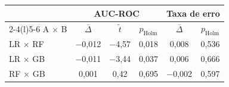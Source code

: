\begin{tabular}{@{}lccccc@{}}
\toprule
 & \multicolumn{3}{c}{AUC-ROC} & \multicolumn{2}{c}{Taxa de erro} \\
\cmidrule(lr){2-4}\cmidrule(l){5-6}
A $\times$ B & $\overline{\Delta}$ & $\tilde{t}$ & $p_{\mathrm{Holm}}$ & $\overline{\Delta}$ & $p_{\mathrm{Holm}}$ \\
\midrule
LR $\times$ RF & $-$0{,}012 & $-$4{,}57 & 0{,}018 & 0{,}008 & 0{,}536 \\
LR $\times$ GB & $-$0{,}011 & $-$3{,}44 & 0{,}037 & 0{,}006 & 0{,}666 \\
RF $\times$ GB & 0{,}001 & 0{,}42 & 0{,}695 & $-$0{,}002 & 0{,}597 \\
\bottomrule
\end{tabular}
